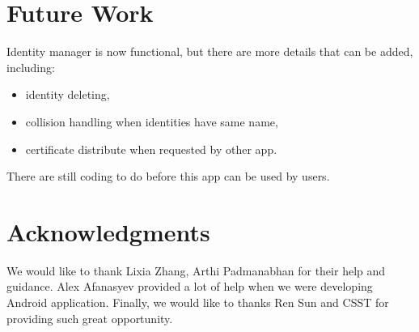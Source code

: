\documentclass[a0,portrait]{poster}
\begin{document}
\begin{multicols}{2}





\section*{Future Work}

\par 
	Identity manager is now functional, but there are more details that can be added, including:
	\begin{itemize}
		\item identity deleting, 
		\item collision handling when identities have same name,
		\item certificate distribute when requested by other app.
	\end{itemize} 
	There are still coding to do before this app can be used by users.


\nocite{*} %


\section*{Acknowledgments}

We would like to thank Lixia Zhang, Arthi Padmanabhan for their help and guidance. Alex Afanasyev provided a lot of help when we were developing Android application. Finally, we would like to thanks Ren Sun and CSST for providing such great opportunity.

\end{multicols}
\end{document}
